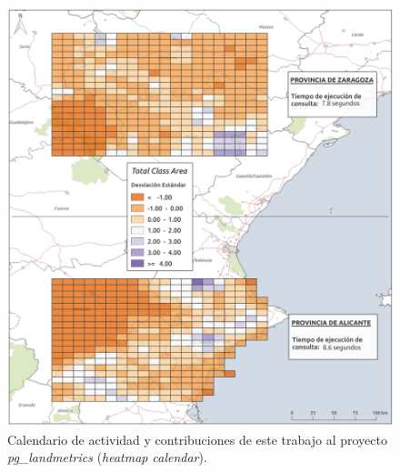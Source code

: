 \begin{figure}
\begin{center}
\includegraphics[width=\textwidth]{ResultadosyDiscusion/Figs/Results/c_25.png}
\caption{Calendario de actividad y contribuciones de este trabajo al proyecto \textit{pg\_landmetrics} (\textit{heatmap calendar}). \label{fig:c_25}}
\end{center}
\end{figure}
